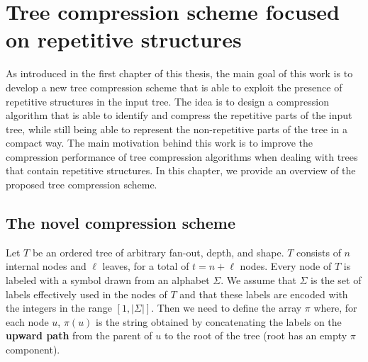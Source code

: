 \chapter{Tree compression scheme focused on repetitive structures} \label{chp:project_overview}
As introduced in the first chapter of this thesis, the main goal of this work is to develop a new tree compression scheme that is able to exploit the presence of repetitive structures in the input tree. The idea is to design a compression algorithm that is able to identify and compress the repetitive parts of the input tree, while still being able to represent the non-repetitive parts of the tree in a compact way. The main motivation behind this work is to improve the compression performance of tree compression algorithms when dealing with trees that contain repetitive structures. In this chapter, we provide an overview of the proposed tree compression scheme.

\section{The novel compression scheme}
Let $ T $ be an ordered tree of arbitrary fan-out, depth, and shape. $ T $ consists of $ n $ internal nodes and $ \ell $ leaves, for a total of $ t = n + \ell $ nodes. Every node of $ T $ is labeled with a symbol drawn from an alphabet $ \Sigma $. We assume that $ \Sigma $ is the set of labels effectively used in the nodes of $T$ and that these labels are encoded with the integers in the range $[1, |\Sigma|]$. Then we need to define the array $\pi$ where, for each node $u$, $\pi(u)$ is the string obtained by concatenating the labels on the \textbf{upward path} from the parent of $u$ to the root of the tree (root has an empty $\pi$ component).

